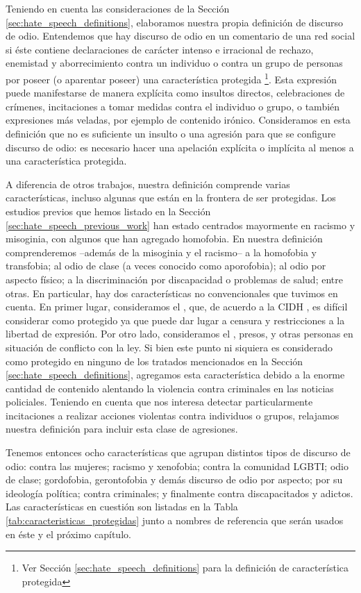 Teniendo en cuenta las consideraciones de la Sección \ref{sec:hate_speech_definitions}, elaboramos nuestra propia definición de discurso de odio. Entendemos que hay discurso de odio en un comentario de una red social si éste contiene declaraciones de carácter intenso e irracional de rechazo, enemistad y aborrecimiento contra un individuo o contra un grupo de personas por poseer (o aparentar poseer) una característica protegida \footnote{Ver Sección \ref{sec:hate_speech_definitions} para la definición de característica protegida}. Esta expresión puede manifestarse de manera explícita como insultos directos, celebraciones de crímenes, incitaciones a tomar medidas contra el individuo o grupo, o también expresiones más veladas, por ejemplo de contenido irónico. Consideramos en esta definición que no es suficiente un insulto o una agresión para que se configure discurso de odio: es necesario hacer una apelación explícita o implícita al menos a una característica protegida.

A diferencia de otros trabajos, nuestra definición comprende varias características, incluso algunas que están en la frontera de ser protegidas. Los estudios previos que hemos listado en la Sección \ref{sec:hate_speech_previous_work} han estado centrados mayormente en racismo y misoginia, con algunos que han agregado homofobia. En nuestra definición comprenderemos --además de la misoginia y el racismo-- a la homofobia y transfobia; al odio de clase (a veces conocido como aporofobia); al odio por aspecto físico; a la discriminación por discapacidad o problemas de salud; entre otras. En particular, hay dos características no convencionales que tuvimos en cuenta. En primer lugar, consideramos el , que, de acuerdo a la CIDH \cite{CIDH2015}, es difícil considerar como protegido ya que puede dar lugar a censura y restricciones a la libertad de expresión. Por otro lado, consideramos el , presos, y otras personas en situación de conflicto con la ley. Si bien este punto ni siquiera es considerado como protegido en ninguno de los tratados mencionados en la Sección \ref{sec:hate_speech_definitions}, agregamos esta característica debido a la enorme cantidad de contenido alentando la violencia contra criminales en las noticias policiales. Teniendo en cuenta que nos interesa detectar particularmente incitaciones a realizar acciones violentas contra individuos o grupos, relajamos nuestra definición para incluir esta clase de agresiones.

Tenemos entonces ocho características que agrupan distintos tipos de discurso de odio: contra las mujeres; racismo y xenofobia; contra la comunidad LGBTI; odio de clase; gordofobia, gerontofobia y demás discurso de odio por aspecto; por su ideología política; contra criminales; y finalmente contra discapacitados y adictos. Las características en cuestión son listadas en la Tabla \ref{tab:caracteristicas_protegidas} junto a nombres de referencia que serán usados en éste y el próximo capítulo.

